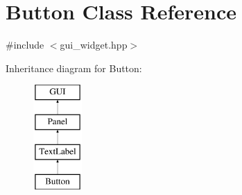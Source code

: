 \hypertarget{class_button}{}\section{Button Class Reference}
\label{class_button}


{\ttfamily \#include $<$gui\+\_\+widget.\+hpp$>$}

Inheritance diagram for Button\+:\begin{figure}[H]
\begin{center}
\leavevmode
\includegraphics[height=4.000000cm]{class_button}
\end{center}
\end{figure}

